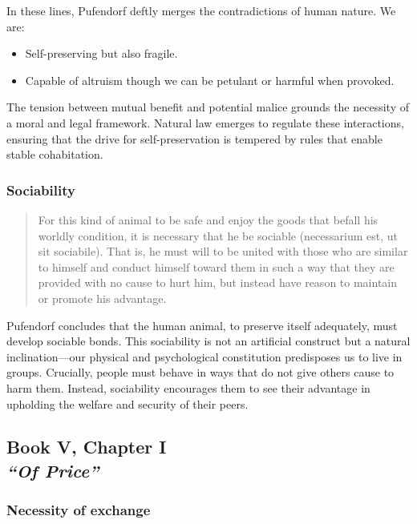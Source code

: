             In these lines, Pufendorf deftly merges the contradictions of human nature. We are:

            \begin{itemize}
                \item Self-preserving but also fragile.
                \item Capable of altruism though we can be petulant or harmful when provoked.
            \end{itemize}

            The tension between mutual benefit and potential malice grounds the necessity of a moral and legal framework. Natural law emerges to regulate these interactions, ensuring that the drive for self-preservation is tempered by rules that enable stable cohabitation.

        \subsubsection{Sociability}

            \begin{quote}
                For this kind of animal to be safe and enjoy the goods that befall his worldly condition, it is necessary that he be sociable (necessarium est, ut sit sociabile). That is, he must will to be united with those who are similar to himself and conduct himself toward them in such a way that they are provided with no cause to hurt him, but instead have reason to maintain or promote his advantage.
            \end{quote}

            Pufendorf concludes that the human animal, to preserve itself adequately, must develop sociable bonds. This sociability is not an artificial construct but a natural inclination—our physical and psychological constitution predisposes us to live in groups. Crucially, people must behave in ways that do not give others cause to harm them. Instead, sociability encourages them to see their advantage in upholding the welfare and security of their peers.

    \subsection[Of Price]{Book V, Chapter I\\
                \textit{“Of Price”}}

        \subsubsection{Necessity of exchange}

